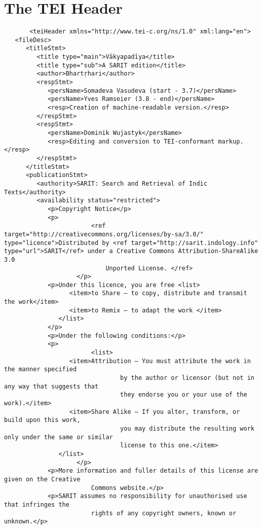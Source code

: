 \documentclass[article,12pt,a4paper]{memoir}%
\begin{document}
	 \chapter{The TEI Header}
	 \begin{verbatim}
       <teiHeader xmlns="http://www.tei-c.org/ns/1.0" xml:lang="en">
   <fileDesc>
      <titleStmt>
         <title type="main">Vākyapadīya</title>
         <title type="sub">A SARIT edition</title>
         <author>Bhartṛhari</author>
         <respStmt>
            <persName>Somadeva Vasudeva (start - 3.7)</persName>
            <persName>Yves Ramseier (3.8 - end)</persName>
            <resp>Creation of machine-readable version.</resp>
         </respStmt>
         <respStmt>
            <persName>Dominik Wujastyk</persName>
            <resp>Editing and conversion to TEI-conformant markup.</resp>
         </respStmt>
      </titleStmt>
      <publicationStmt>
         <authority>SARIT: Search and Retrieval of Indic Texts</authority>
         <availability status="restricted">
            <p>Copyright Notice</p>
            <p>
                        <ref target="http://creativecommons.org/licenses/by-sa/3.0/" type="licence">Distributed by <ref target="http://sarit.indology.info" type="url">SARIT</ref> under a Creative Commons Attribution-ShareAlike 3.0
                            Unported License. </ref>
                    </p>
            <p>Under this licence, you are free <list>
                  <item>to Share — to copy, distribute and transmit the work</item>
                  <item>to Remix — to adapt the work </item>
               </list>
            </p>
            <p>Under the following conditions:</p>
            <p>
                        <list>
                  <item>Attribution — You must attribute the work in the manner specified
                                by the author or licensor (but not in any way that suggests that
                                they endorse you or your use of the work).</item>
                  <item>Share Alike — If you alter, transform, or build upon this work,
                                you may distribute the resulting work only under the same or similar
                                license to this one.</item>
               </list>
                    </p>
            <p>More information and fuller details of this license are given on the Creative
                        Commons website.</p>
            <p>SARIT assumes no responsibility for unauthorised use that infringes the
                        rights of any copyright owners, known or unknown.</p>

\end{verbatim}
\end{document}
